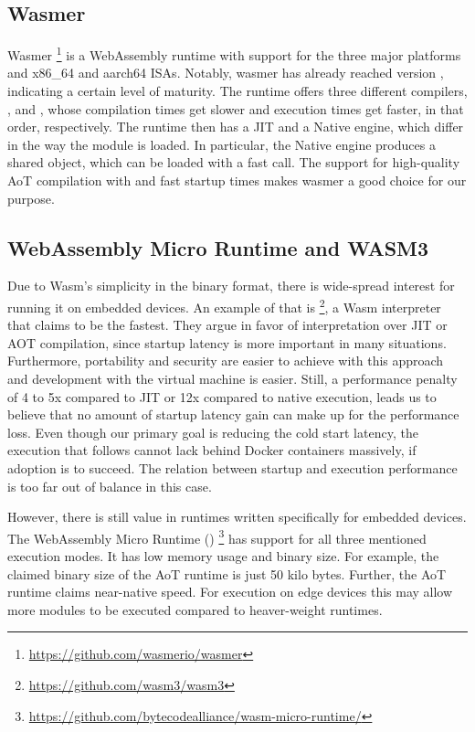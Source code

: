 \subsection{Wasmer}

Wasmer \footnote{\url{https://github.com/wasmerio/wasmer}} is a WebAssembly runtime with support for the three major platforms and x86\_64 and aarch64 ISAs. Notably, wasmer has already reached version , indicating a certain level of maturity. The runtime offers three different compilers, ,  and , whose compilation times get slower and execution times get faster, in that order, respectively. The runtime then has a JIT and a Native engine, which differ in the way the module is loaded. In particular, the Native engine produces a shared object, which can be loaded with a fast  call. The support for high-quality AoT compilation with  and fast startup times makes wasmer a good choice for our purpose.

\subsection{WebAssembly Micro Runtime and WASM3}

Due to Wasm's simplicity in the binary format, there is wide-spread interest for running it on embedded devices. An example of that is  \footnote{\url{https://github.com/wasm3/wasm3}}, a Wasm interpreter that claims to be the fastest. They argue in favor of interpretation over JIT or AOT compilation, since startup latency is more important in many situations. Furthermore, portability and security are easier to achieve with this approach and development with the virtual machine is easier. Still, a performance penalty of 4 to 5x compared to JIT or 12x compared to native execution, leads us to believe that no amount of startup latency gain can make up for the performance loss. Even though our primary goal is reducing the cold start latency, the execution that follows cannot lack behind Docker containers massively, if adoption is to succeed. The relation between startup and execution performance is too far out of balance in this case.

However, there is still value in runtimes written specifically for embedded devices. The WebAssembly Micro Runtime () \footnote{\url{https://github.com/bytecodealliance/wasm-micro-runtime/}} has support for all three mentioned execution modes. It has low memory usage and binary size. For example, the claimed binary size of the AoT runtime is just 50 kilo bytes. Further, the AoT runtime claims near-native speed. For execution on edge devices this may allow more modules to be executed compared to heaver-weight runtimes.





